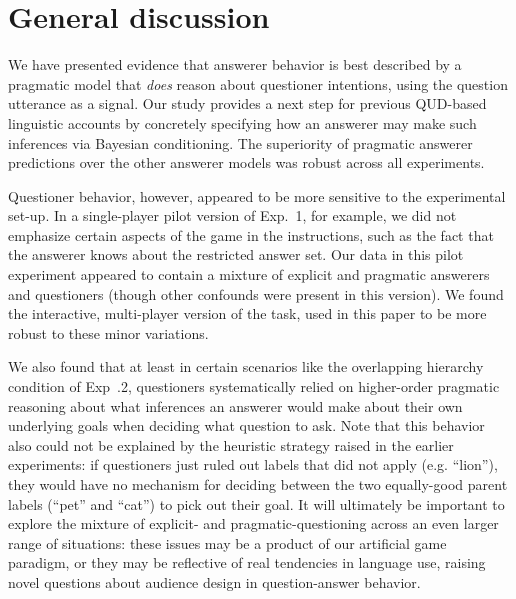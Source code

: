 \documentclass[12pt, floatsintext, jou]{apa6}
\begin{document}
\section{General discussion}
\label{sec:gd}

We have presented evidence that answerer behavior is best described by a pragmatic model that \emph{does} reason about questioner intentions, using the question utterance as a signal. Our study provides a next step for previous QUD-based linguistic accounts by concretely specifying how an answerer may make such inferences via Bayesian conditioning. The superiority of pragmatic answerer predictions over the other answerer models was robust across all experiments. 

Questioner behavior, however, appeared to be more sensitive to the experimental set-up. In a single-player pilot version of Exp.~1, for example, we did not emphasize certain aspects of the game in the instructions, such as the fact that the answerer knows about the restricted answer set. Our data in this pilot experiment appeared to contain a mixture of explicit and pragmatic answerers and questioners (though other confounds were present in this version). We found the interactive, multi-player version of the task, used in this paper to be more robust to these minor variations. 

We also found that at least in certain scenarios like the overlapping hierarchy condition of Exp~.2, questioners systematically relied on higher-order pragmatic reasoning about what inferences an answerer would make about their own underlying goals when deciding what question to ask. Note that this behavior also could not be explained by the heuristic strategy raised in the earlier experiments: if questioners just ruled out labels that did not apply (e.g. ``lion''), they would have no mechanism for deciding between the two equally-good parent labels (``pet'' and ``cat'') to pick out their goal. It will ultimately be important to explore the mixture of explicit- and pragmatic-questioning across an even larger range of situations: these issues may be a product of our artificial game paradigm, or they may be reflective of real tendencies in language use, raising novel questions about audience design in question-answer behavior.


\end{document}
